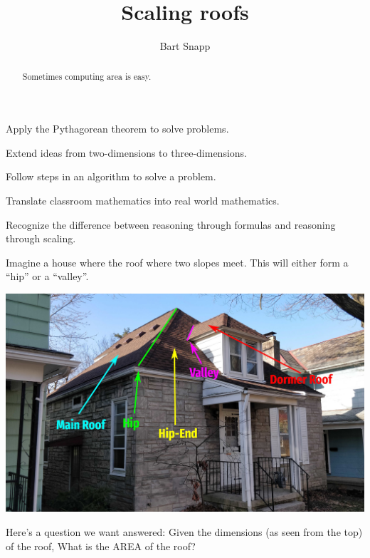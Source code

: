 \documentclass[hints,nooutcomes,noauthor,handout,12pt]{ximera}
\title{Scaling roofs}
\author{Bart Snapp}
\begin{document}
\begin{abstract}
  Sometimes computing area is easy.
\end{abstract}
\maketitle


\begin{listOutcomes}
\item Apply the Pythagorean theorem to solve problems.
\item Extend ideas from two-dimensions to three-dimensions.
\item Follow steps in an algorithm to solve a problem.
\item Translate classroom mathematics into real world mathematics.
\item Recognize the difference between reasoning through formulas and
  reasoning through scaling.
\end{listOutcomes}


Imagine a house where the roof where two slopes meet. This will either
form a ``hip'' or a ``valley''.
\begin{center}
  \includegraphics[width=.8\textwidth]{house.jpg}
\end{center}
Here's a question we want answered:
Given the dimensions (as seen from the top) of the roof, What is the AREA of the roof?



\mynewpage
\end{document}
